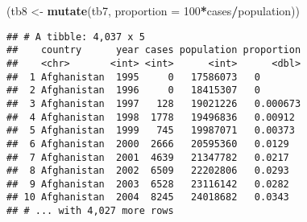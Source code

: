 \documentclass[]{article}
\newenvironment{Shaded}{\begin{snugshade}}{\end{snugshade}}
\newcommand{\CommentTok}[1]{\textcolor[rgb]{0.56,0.35,0.01}{\textit{#1}}}
\newcommand{\DataTypeTok}[1]{\textcolor[rgb]{0.13,0.29,0.53}{#1}}
\newcommand{\DecValTok}[1]{\textcolor[rgb]{0.00,0.00,0.81}{#1}}
\newcommand{\KeywordTok}[1]{\textcolor[rgb]{0.13,0.29,0.53}{\textbf{#1}}}
\newcommand{\NormalTok}[1]{#1}
\newcommand{\OperatorTok}[1]{\textcolor[rgb]{0.81,0.36,0.00}{\textbf{#1}}}
\newcommand{\OtherTok}[1]{\textcolor[rgb]{0.56,0.35,0.01}{#1}}
\newcommand{\StringTok}[1]{\textcolor[rgb]{0.31,0.60,0.02}{#1}}
\begin{document}
\begin{Shaded}
\begin{Highlighting}[]
\NormalTok{(tb8 <-}\StringTok{ }\KeywordTok{mutate}\NormalTok{(tb7, }\DataTypeTok{proportion =} \DecValTok{100}\OperatorTok{*}\NormalTok{cases}\OperatorTok{/}\NormalTok{population))}
\end{Highlighting}
\end{Shaded}

\begin{verbatim}
## # A tibble: 4,037 x 5
##    country      year cases population proportion
##    <chr>       <int> <int>      <int>      <dbl>
##  1 Afghanistan  1995     0   17586073   0       
##  2 Afghanistan  1996     0   18415307   0       
##  3 Afghanistan  1997   128   19021226   0.000673
##  4 Afghanistan  1998  1778   19496836   0.00912 
##  5 Afghanistan  1999   745   19987071   0.00373 
##  6 Afghanistan  2000  2666   20595360   0.0129  
##  7 Afghanistan  2001  4639   21347782   0.0217  
##  8 Afghanistan  2002  6509   22202806   0.0293  
##  9 Afghanistan  2003  6528   23116142   0.0282  
## 10 Afghanistan  2004  8245   24018682   0.0343  
## # ... with 4,027 more rows
\end{verbatim}

\begin{Shaded}
\end{Shaded}
\end{document}
